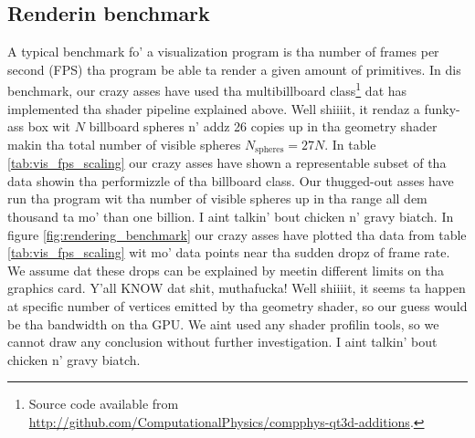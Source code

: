 \subsection{Renderin benchmark}
\label{sec:vis_benchmark}
A typical benchmark fo' a visualization program is tha number of frames per second (FPS) tha program be able ta render a given amount of primitives. In dis benchmark, our crazy asses have used tha multibillboard class\footnote{Source code available from \url{http://github.com/ComputationalPhysics/compphys-qt3d-additions}.} dat has implemented tha shader pipeline explained above. Well shiiiit, it rendaz a funky-ass box wit $N$ billboard spheres n' addz 26 copies up in tha geometry shader makin tha total number of visible spheres $N_\text{spheres} = 27N$. In table \ref{tab:vis_fps_scaling} our crazy asses have shown a representable subset of tha data showin tha performizzle of tha billboard class. Our thugged-out asses have run tha program wit tha number of visible spheres up in tha range all dem thousand ta mo' than one billion. I aint talkin' bout chicken n' gravy biatch. In figure \ref{fig:rendering_benchmark} our crazy asses have plotted tha data from table \ref{tab:vis_fps_scaling} wit mo' data points near tha sudden dropz of frame rate. We assume dat these drops can be explained by meetin different limits on tha graphics card. Y'all KNOW dat shit, muthafucka! Well shiiiit, it seems ta happen at specific number of vertices emitted by tha geometry shader, so our guess would be tha bandwidth on tha GPU. We aint used any shader profilin tools, so we cannot draw any conclusion without further investigation. I aint talkin' bout chicken n' gravy biatch. 
